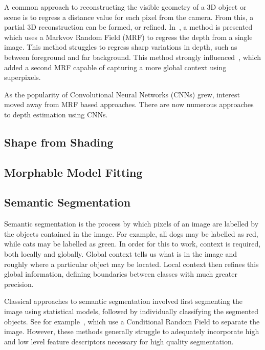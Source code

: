 A common approach to reconstructing the visible geometry of a 3D
object or scene is to regress a distance value for each pixel from the
camera. From this, a partial 3D reconstruction can be formed, or
refined. In~\cite{saxena2006learning}, a method is presented which
uses a Markvov Random Field (MRF) to regress the depth from a single
image. This method struggles to regress sharp variations in depth,
such as between foreground and far background. This method strongly
influenced~\cite{liu2010single}, which added a second MRF capable of
capturing a more global context using superpixels.

As the popularity of Convolutional Neural Networks (CNNs) grew,
interest moved away from MRF based approaches. There are now numerous
approaches to depth estimation using CNNs.

\subsection{Shape from Shading}

\subsection{Morphable Model Fitting}

\subsection{Semantic Segmentation}

Semantic segmentation is the process by which pixels of an image are
labelled by the objects contained in the image. For example, all dogs
may be labelled as red, while cats may be labelled as green. In order
for this to work, context is required, both locally and
globally. Global context tells us what is in the image and roughly
where a particular object may be located. Local context then refines
this global information, defining boundaries between classes with much
greater precision.

Classical approaches to semantic segmentation involved first
segmenting the image using statistical models, followed by
individually classifying the segmented objects. See for
example~\cite{arbelaez2012semantic,carreira2012semantic}, which use a
Conditional Random Field to separate the image. However, these methods
generally struggle to adequately incorporate high and low level
feature descriptors necessary for high quality segmentation.

